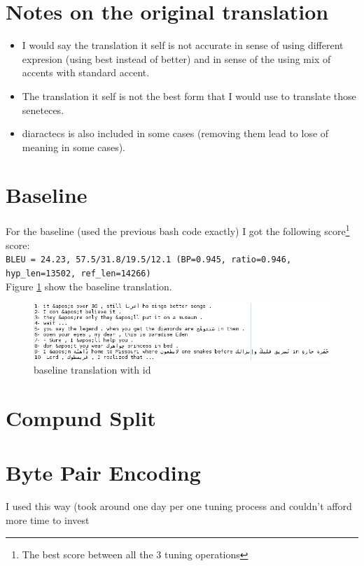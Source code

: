 \documentclass{article}
\begin{document}
\section{Notes on the original translation}
\begin{itemize}
\item I would say the translation it self is not accurate in sense of using different expresion (using best instead of better) and in sense of the using mix of accents with standard accent.
\item The translation it self is not the best form that I would use to translate those seneteces.
\item diaractecs is also included in some cases (removing them lead to lose of meaning in some cases).
\end{itemize}
\section{Baseline}
For the baseline (used the previous bash code exactly) I got the following score\footnote{The best score between all the 3 tuning operations} score:\\ \texttt{BLEU = 24.23, 57.5/31.8/19.5/12.1 (BP=0.945, ratio=0.946, hyp\_len=13502, ref\_len=14266)}\\
Figure \ref{fig:2} show the baseline translation.
\begin{figure}[H]
\includegraphics[scale=0.5]{baselinetest.png}
\caption{baseline translation with id\label{fig:2}}
\end{figure}
\section{Compund Split}

\section{Byte Pair Encoding}
I used this way (took around one day per one tuning process and couldn't afford more time to invest 
\end{document}
